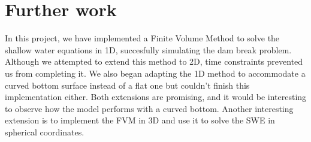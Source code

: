 \section{Further work}
In this project, we have implemented a Finite Volume Method to solve the shallow water equations in 1D, succesfully simulating the dam break problem.
Although we attempted to extend this method to 2D, time constraints prevented us from completing it.
We also began adapting the 1D method to accommodate a curved bottom surface instead of a flat one but couldn't finish this implementation either.
Both extensions are promising, and it would be interesting to observe how the model performs with a curved bottom.
Another interesting extension is to implement the FVM in 3D and use it to solve the SWE in spherical coordinates.
